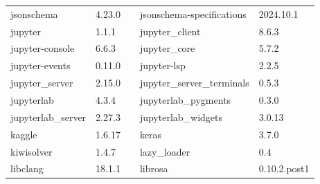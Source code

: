 \begin{table}[h]
{\begin{tabular}{llp{2cm}ll}
        jsonschema & 4.23.0 && jsonschema-specifications & 2024.10.1 \\
        jupyter & 1.1.1 && jupyter\_client & 8.6.3 \\
        jupyter-console & 6.6.3 && jupyter\_core & 5.7.2 \\
        jupyter-events & 0.11.0 && jupyter-lsp & 2.2.5 \\
        jupyter\_server & 2.15.0 && jupyter\_server\_terminals & 0.5.3 \\
        jupyterlab & 4.3.4 && jupyterlab\_pygments & 0.3.0 \\
        jupyterlab\_server & 2.27.3 && jupyterlab\_widgets & 3.0.13 \\
        kaggle & 1.6.17 && keras & 3.7.0 \\
        kiwisolver & 1.4.7 && lazy\_loader & 0.4 \\
        libclang & 18.1.1 && librosa & 0.10.2.post1 \\
        \bottomrule
    \end{tabular}
    }
    \label{apendice-a:paquetes}
\end{table}
